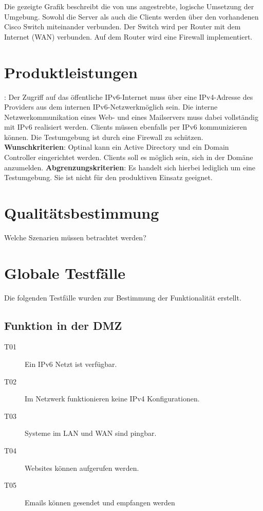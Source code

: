 Die gezeigte Grafik beschreibt die von uns angestrebte, logische Umsetzung der Umgebung. Sowohl die Server als auch die Clients werden über den vorhandenen Cisco Switch miteinander verbunden. Der Switch wird per Router mit dem Internet (WAN) verbunden. Auf dem Router wird eine Firewall implementiert.







\section{Produktleistungen}

: Der Zugriff auf das öffentliche IPv6-Internet muss über eine IPv4-Adresse des Providers aus dem internen IPv6-Netzwerkmöglich sein. Die interne Netzwerkommunikation eines Web- und eines Mailservers muss dabei vollständig mit IPv6 realisiert werden. Clients müssen ebenfalls per IPv6 kommunizieren können. Die Testumgebung ist durch eine Firewall zu schützen. {\bf Wunschkriterien}: Optinal kann ein Active Directory und ein Domain Controller eingerichtet werden. Clients soll es möglich sein, sich in der Domäne anzumelden. {\bf Abgrenzungskriterien}: Es handelt sich hierbei lediglich um eine Testumgebung. Sie ist nicht für den produktiven Einsatz geeignet.\section{Qualitätsbestimmung}

Welche Szenarien müssen betrachtet werden?





\section{Globale Testfälle}
Die folgenden Testfälle wurden zur Bestimmung der Funktionalität erstellt.
\subsection{Funktion in der DMZ}
\begin{description}
\item [T01] Ein IPv6 Netzt ist verfügbar.
\item [T02] Im Netzwerk funktionieren keine IPv4 Konfigurationen.
\item [T03] Systeme im LAN und WAN sind pingbar.
\item [T04] Websites können aufgerufen werden.
\item [T05] Emails können gesendet und empfangen werden
\end{description}
